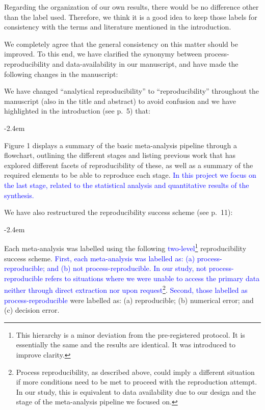 \documentclass[draft]{article}
\renewenvironment{quote}{\begin{fquote}\advance\leftmargini -2.4em\begin{oldquote}}{\end{oldquote}\end{fquote}}
\newenvironment{fquote}
  {\def\FrameCommand{
	\fboxsep=0.6em %
	\fcolorbox{black}{white}}%
    \MakeFramed {\advance\hsize-2\width \FrameRestore}
    \begin{minipage}{\linewidth}
  }
  {\end{minipage}\endMakeFramed}
\begin{document}
Regarding the organization of our own results, there would be no difference other than the label used. Therefore, we think it is a good idea to keep those labels for consistency with the terms and literature mentioned in the introduction.

We completely agree that the general consistency on this matter should be improved. To this end, we have clarified the synonymy between process-reproducibility and data-availability in our manuscript, and have made the following changes in the manuscript:

We have changed ``analytical reproducibility'' to ``reproducibility'' throughout the manuscript (also in the title and abstract) to avoid confusion and we have highlighted in the introduction (see p.~5) that:

\begin{quote}
Figure 1 displays a summary of the basic meta-analysis pipeline through a flowchart, outlining the different stages and listing previous work that has explored different facets of reproducibility of these, as well as a summary of the required elements to be able to reproduce each stage. \textcolor{blue}{In this project we focus on the last stage, related to the statistical analysis and quantitative results of the synthesis.}
\end{quote}

We have also restructured the reproducibility success scheme (see p.~11):

\begin{quote}
Each meta-analysis was labelled using the following \textcolor{blue}{two-level}\footnote{This hierarchy is a minor deviation from the pre-registered protocol. It is essentially the same and the results are identical. It was introduced to improve clarity.} reproducibility success scheme. \textcolor{blue}{First, each meta-analysis was labelled as: (a) process-reproducible; and (b) not process-reproducible. In our study, not process-reproducible refers to situations where we were unable to access the primary data neither through direct extraction nor upon request}\footnote{Process reproducibility, as described above, could imply a different situation if more conditions need to be met to proceed with the reproduction attempt. In our study, this is equivalent to data availability due to our design and the stage of the meta-analysis pipeline we focused on.}. \textcolor{blue}{Second, those labelled as process-reproducible} were labelled as: (a) reproducible; (b) numerical error; and (c) decision error.
\end{quote}
\end{document}
